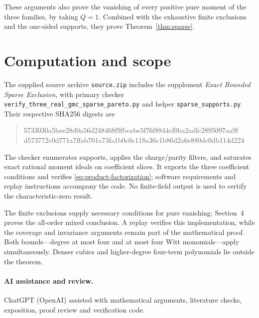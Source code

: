 \documentclass[11pt]{article}
\begin{document}
These arguments also prove the vanishing of every positive pure moment
of the three families, by taking \(Q=1\).  Combined with the exhaustive
finite exclusions and the one-sided supports, they prove
Theorem~\ref{thm:sparse}.

\section{Computation and scope}

The supplied source archive \texttt{source.zip} includes the supplement
\emph{Exact Bounded Sparse Exclusion}, with primary checker
\texttt{verify\_three\_real\_gmc\_sparse\_pareto.py} and helper
\texttt{sparse\_supports.py}.  Their respective SHA256 digests are
\begin{quote}
\footnotesize\ttfamily
5733030a5bee28d0a56d248468f9fbcebe5f76f8844cf0ba2adfc2895097aa9f\\
d573772c0d771a7ffab701a73fa1b0c0c118a36c1b86d2a6e880dc0db114d224
\end{quote}
The checker enumerates supports, applies the charge/parity filters, and
saturates exact rational moment ideals on coefficient slices.  It exports
the three coefficient conditions and verifies
\eqref{eq:product-factorization}; software requirements and replay
instructions accompany the code.  No finite-field output is used to
certify the characteristic-zero result.

The finite exclusions supply necessary conditions for pure vanishing;
Section~4 proves the all-order mixed conclusion.  A replay verifies this
implementation, while the coverage and invariance arguments remain part
of the mathematical proof.  Both bounds---degree at most four and at most
four Witt monomials---apply simultaneously.  Denser cubics and higher-degree
four-term polynomials lie outside the theorem.

\paragraph{AI assistance and review.}
ChatGPT (OpenAI) assisted with mathematical arguments, literature checks,
exposition, proof review and verification code.



\end{document}
